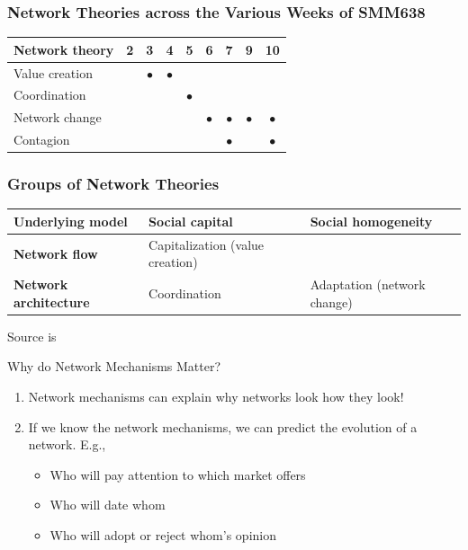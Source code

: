 \documentclass[notes, aspectratio=1610]{beamer}
\begin{document}
\begin{frame}
	\frametitle{Network Theories across the Various Weeks of SMM638}
	\begin{table}
		\begin{tabular}[c]{l|c|c|c|c|c|c|c|c}
			\textbf{Network theory} & 
			\textbf{2} & 
			\textbf{3} & 
			\textbf{4} & 
			\textbf{5} & 
			\textbf{6} & 
			\textbf{7} & 
			\textbf{9} & 
			\textbf{10}\\
			\hline
			Value creation &  & $\bullet$ & $\bullet$ &  &  &  &  & \\	
			Coordination &  &  &  & $\bullet$ &  &  &  & \\	
			Network change &  &  &  &  & $\bullet$ & $\bullet$ & $\bullet$ & $\bullet$\\	
			Contagion &  &  &  &  &  & $\bullet$ &  & $\bullet$ \\	
		\end{tabular}
	\end{table}
\end{frame}

\begin{frame}
	\frametitle{Groups of Network Theories}
	\centering
	\small
	\begin{table}
		\begin{center}
			\begin{tabular}[c]{l|l|l}
				\textbf{Underlying model} & 
				\textbf{Social capital} &
				\textbf{Social homogeneity}\\
				\hline
				\textbf{Network flow} &
				Capitalization (value creation) & 
				\cellcolor{blue!20}{\color{black}{Contagion}}  \\
				\hline
				\textbf{Network architecture} & 
				Coordination & 
				Adaptation  (network change)\\
			\end{tabular}
		\end{center}
	\end{table}

	\vspace{1em}

	\raggedright \small Source is~\cite[][page 47]{scott2011}
\end{frame}

\begin{frame}{Why do Network Mechanisms Matter?}{}
	\begin{enumerate}
		\item Network mechanisms can explain why networks look how 
		they look!
		\item If we know the network mechanisms, we can predict the
		evolution of a network. E.g.,
		\begin{itemize}
			\item 
			Who will pay attention to which market offers
			\item 
			Who will date whom
			\item 
			Who will adopt or reject whom's opinion
		\end{itemize}
	\end{enumerate}
\end{frame}
\end{document}
